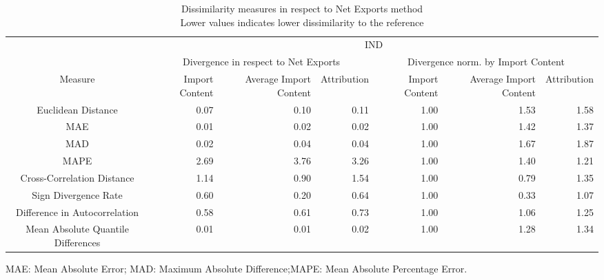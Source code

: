 \begin{table}[t]
\caption*{
{\large Dissimilarity measures in respect to Net Exports method} \\ 
{\small Lower values indicates lower dissimilarity to the reference}
} 
\fontsize{15.0pt}{18.0pt}\selectfont
\begin{tabular*}{\linewidth}{@{\extracolsep{\fill}}crrrrrr}
\toprule
 & \multicolumn{6}{c}{IND} \\ 
\cmidrule(lr){2-7}
 & \multicolumn{3}{c}{Divergence in respect to Net Exports} & \multicolumn{3}{c}{Divergence norm. by Import Content} \\ 
\cmidrule(lr){2-4} \cmidrule(lr){5-7}
Measure & Import Content & Average Import Content & Attribution & Import Content & Average Import Content & Attribution \\ 
\midrule\addlinespace[2.5pt]
Euclidean Distance & 0.07 & 0.10 & 0.11 & 1.00 & 1.53 & 1.58 \\ 
MAE & 0.01 & 0.02 & 0.02 & 1.00 & 1.42 & 1.37 \\ 
MAD & 0.02 & 0.04 & 0.04 & 1.00 & 1.67 & 1.87 \\ 
MAPE & 2.69 & 3.76 & 3.26 & 1.00 & 1.40 & 1.21 \\ 
Cross-Correlation Distance & 1.14 & 0.90 & 1.54 & 1.00 & 0.79 & 1.35 \\ 
Sign Divergence Rate & 0.60 & 0.20 & 0.64 & 1.00 & 0.33 & 1.07 \\ 
Difference in Autocorrelation & 0.58 & 0.61 & 0.73 & 1.00 & 1.06 & 1.25 \\ 
Mean Absolute Quantile Differences & 0.01 & 0.01 & 0.02 & 1.00 & 1.28 & 1.34 \\ 
\bottomrule
\end{tabular*}
\begin{minipage}{\linewidth}
MAE: Mean Absolute Error; MAD: Maximum Absolute Difference;MAPE: Mean Absolute Percentage Error.\\
\end{minipage}
\end{table}

